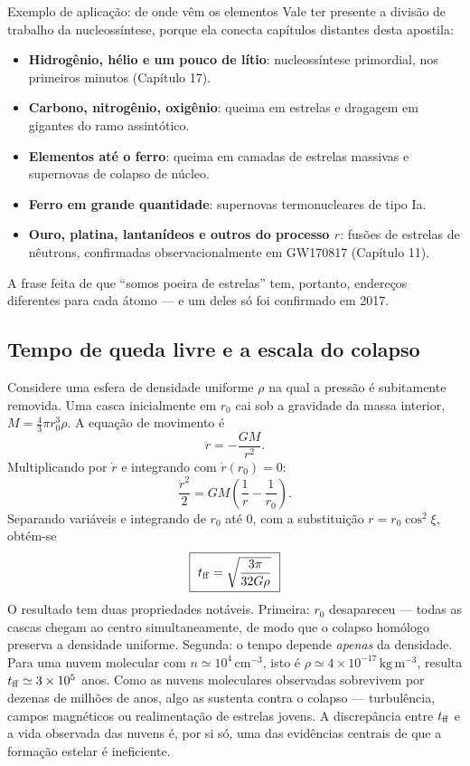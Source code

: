 \documentclass[11pt,a4paper]{article}
\begin{document}
\begin{lessonblock}{Exemplo de aplicação: de onde vêm os elementos}
Vale ter presente a divisão de trabalho da nucleossíntese, porque ela conecta capítulos distantes desta apostila:
\begin{itemize}
\item \textbf{Hidrogênio, hélio e um pouco de lítio}: nucleossíntese primordial, nos primeiros minutos (Capítulo 17).
\item \textbf{Carbono, nitrogênio, oxigênio}: queima em estrelas e dragagem em gigantes do ramo assintótico.
\item \textbf{Elementos até o ferro}: queima em camadas de estrelas massivas e supernovas de colapso de núcleo.
\item \textbf{Ferro em grande quantidade}: supernovas termonucleares de tipo Ia.
\item \textbf{Ouro, platina, lantanídeos e outros do processo $r$}: fusões de estrelas de nêutrons, confirmadas observacionalmente em GW170817 (Capítulo 11).
\end{itemize}
A frase feita de que ``somos poeira de estrelas'' tem, portanto, endereços diferentes para cada átomo --- e um deles só foi confirmado em 2017.
\end{lessonblock}

\subsection*{Tempo de queda livre e a escala do colapso}

Considere uma esfera de densidade uniforme $\rho$ na qual a pressão é subitamente removida. Uma casca inicialmente em $r_0$ cai sob a gravidade da massa interior, $M=\frac{4}{3}\pi r_0^{3}\rho$. A equação de movimento é
\[
\ddot{r}=-\frac{GM}{r^{2}}.
\]
Multiplicando por $\dot{r}$ e integrando com $\dot{r}(r_0)=0$:
\[
\frac{\dot{r}^{2}}{2}=GM\left(\frac{1}{r}-\frac{1}{r_0}\right).
\]
Separando variáveis e integrando de $r_0$ até $0$, com a substituição $r=r_0\cos^{2}\xi$, obtém-se
\[
\boxed{\ t_{\rm ff}=\sqrt{\frac{3\pi}{32G\rho}}\ }
\]
O resultado tem duas propriedades notáveis. Primeira: $r_0$ desapareceu --- todas as cascas chegam ao centro simultaneamente, de modo que o colapso homólogo preserva a densidade uniforme. Segunda: o tempo depende \emph{apenas} da densidade. Para uma nuvem molecular com $n\simeq10^{4}\,\mathrm{cm^{-3}}$, isto é $\rho\simeq4\times10^{-17}\,\mathrm{kg\,m^{-3}}$, resulta $t_{\rm ff}\simeq3\times10^{5}$ anos. Como as nuvens moleculares observadas sobrevivem por dezenas de milhões de anos, algo as sustenta contra o colapso --- turbulência, campos magnéticos ou realimentação de estrelas jovens. A discrepância entre $t_{\rm ff}$ e a vida observada das nuvens é, por si só, uma das evidências centrais de que a formação estelar é ineficiente.
\end{document}
